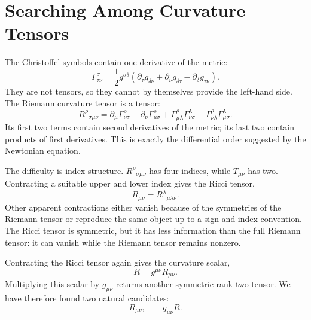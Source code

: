 \section{Searching Among Curvature Tensors}

The Christoffel symbols contain one derivative of the metric:
\begin{equation}
 \Gamma^\sigma_{\tau\nu}
 =
 \frac12 g^{\sigma\delta}
 \left(
 \partial_\tau g_{\delta\nu}
 +\partial_\nu g_{\delta\tau}
 -\partial_\delta g_{\tau\nu}
 \right).
 \label{eq:christoffel}
\end{equation}
They are not tensors, so they cannot by themselves provide the left-hand side.
The Riemann curvature tensor is a tensor:
\begin{equation}
 R^\rho{}_{\sigma\mu\nu}
 =
 \partial_\mu\Gamma^\rho_{\nu\sigma}
 -\partial_\nu\Gamma^\rho_{\mu\sigma}
 +\Gamma^\rho_{\mu\lambda}\Gamma^\lambda_{\nu\sigma}
 -\Gamma^\rho_{\nu\lambda}\Gamma^\lambda_{\mu\sigma}.
 \label{eq:riemann}
\end{equation}
Its first two terms contain second derivatives of the metric; its last two
contain products of first derivatives. This is exactly the differential
order suggested by the Newtonian equation.

The difficulty is index structure. \(R^\rho{}_{\sigma\mu\nu}\) has four
indices, while \(T_{\mu\nu}\) has two. Contracting a suitable upper and lower
index gives the Ricci tensor,
\begin{equation}
 R_{\mu\nu}=R^\lambda{}_{\mu\lambda\nu}.
 \label{eq:ricci}
\end{equation}
Other apparent contractions either vanish because of the symmetries of the
Riemann tensor or reproduce the same object up to a sign and index
convention. The Ricci tensor is symmetric, but it has less information than
the full Riemann tensor: it can vanish while the Riemann tensor remains
nonzero.

\begin{classroomqa}
\end{classroomqa}

Contracting the Ricci tensor again gives the curvature scalar,
\begin{equation}
 R=g^{\mu\nu}R_{\mu\nu}.
 \label{eq:ricci-scalar}
\end{equation}
Multiplying this scalar by \(g_{\mu\nu}\) returns another symmetric rank-two
tensor. We have therefore found two natural candidates:
\begin{equation}
 R_{\mu\nu},
 \qquad
 g_{\mu\nu}R.
\end{equation}

